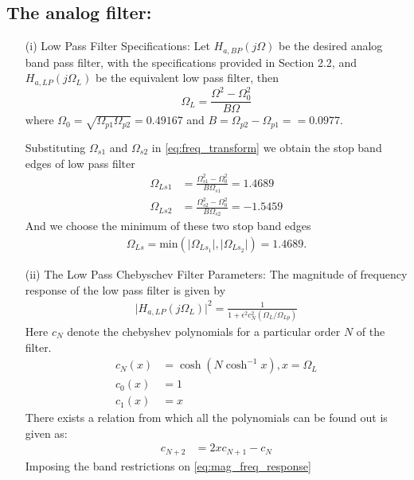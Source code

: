 \documentclass{article}
\begin{document}
\subsection{The analog filter:}
\begin{itemize}
    \item[(i)] Low Pass Filter Specifications: Let $H_{a, BP}(j\Omega)$ be the desired analog band pass filter,  with the specifications provided in Section 2.2, and $H_{a,LP}(j\Omega_L)$ be the equivalent low pass filter, then
\begin{equation}
\Omega_L = \frac{\Omega^2 - \Omega_0^2}{B\Omega} \label{eq:freq_transform}
\end{equation}
where $\Omega_0 = \sqrt{\Omega_{p1}\Omega_{p2}} =0.49167$ and $B = \Omega_{p2} - \Omega_{p1} == 0.0977$.

Substituting $\Omega_{s1}$ and $\Omega_{s2}$ in \eqref{eq:freq_transform} we obtain the stop band edges of low pass filter 
\begin{align}
    \Omega_{Ls1} &= \frac{\Omega_{s1}^2 - \Omega_0^2}{B\Omega_{s1}} = 1.4689\\
    \Omega_{Ls2} &= \frac{\Omega_{s2}^2 - \Omega_0^2}{B\Omega_{s2}} = -1.5459
\end{align}
And we choose the minimum of these two stop band edges
\begin{align}
    \Omega_{Ls} = \mbox{min}(\vert \Omega_{Ls_1}\vert,\vert \Omega_{Ls_2}\vert) = 1.4689.
\end{align}
\item[(ii)] {The Low Pass Chebyschev Filter Parameters:} The magnitude of frequency response of the low pass filter is given by 
\begin{align}
    \vert H_{a,LP}(j\Omega_L)\vert^2 = \frac{1}{1 + \epsilon^2c_N^2(\Omega_L/\Omega_{Lp})} \label{eq:mag_freq_response}
\end{align}
Here $c_N$ denote the chebyshev polynomials for a particular order $N$ of the filter.
\begin{align}
    c_N(x) &= \cosh(N \cosh^{-1}x) , x=\Omega_{L}\\
    c_0(x) &= 1 \\
    c_1(x) &= x
\end{align}
There exists a relation from which all the polynomials can be found out is given as:
\begin{align}
    c_{N+2} &= 2xc_{N+1} - c_{N}  \label{eq:cheby_poly_relation}
\end{align}
Imposing the band restrictions on \eqref{eq:mag_freq_response} \\

\end{itemize}
\end{document}
